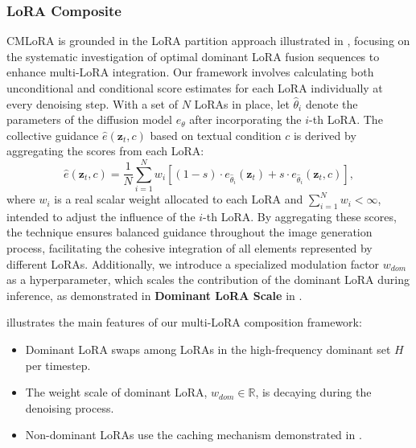 \subsubsection{LoRA Composite}
CMLoRA is grounded in the LoRA partition approach illustrated in , focusing on the systematic investigation of optimal dominant LoRA fusion sequences to enhance multi-LoRA integration. Our framework involves calculating both unconditional and conditional score estimates for each LoRA individually at every denoising step. With a set of $N$ LoRAs in place, let $\hat\theta_{i}$ denote the parameters of the diffusion model $e_{\theta}$ after incorporating the $i$-th LoRA. The collective guidance $\hat{e}(\mathbf{z}_{t},c)$ based on textual condition $c$ is derived by aggregating the scores from each LoRA:
\vspace{-3pt}
\begin{equation}
    \label{lorac}
    \hat{e}(\mathbf{z}_{t},c) = \frac{1}{N}\sum^{N}_{i=1}w_{i}[(1-s)\cdot e_{\hat\theta_{i}}(\mathbf{z}_{t})+s\cdot e_{\hat\theta_{i}}(\mathbf{z}_{t},c)],
\end{equation}
where $w_i$ is a real scalar weight allocated to each LoRA and $\sum^{N}_{i=1}w_{i}<\infty$, intended to adjust the influence of the $i$-th LoRA. By aggregating these scores, the technique ensures balanced guidance throughout the image generation process, facilitating the cohesive integration of all elements represented by different LoRAs. Additionally, we introduce a specialized modulation factor $w_{dom}$ as a hyperparameter, which scales the contribution of the dominant LoRA during inference, as demonstrated in \textbf{Dominant LoRA Scale} in .

 illustrates the main features of our multi-LoRA composition framework: 
\begin{itemize}[noitemsep, topsep=0pt, leftmargin=*]
    \item Dominant LoRA swaps among LoRAs in the high-frequency dominant set $H$ per timestep.
    \item The weight scale of dominant LoRA, $w_{dom} \in \mathbb{R}$, is decaying during the denoising process.
    \item Non-dominant LoRAs use the caching mechanism demonstrated in .
\end{itemize}
